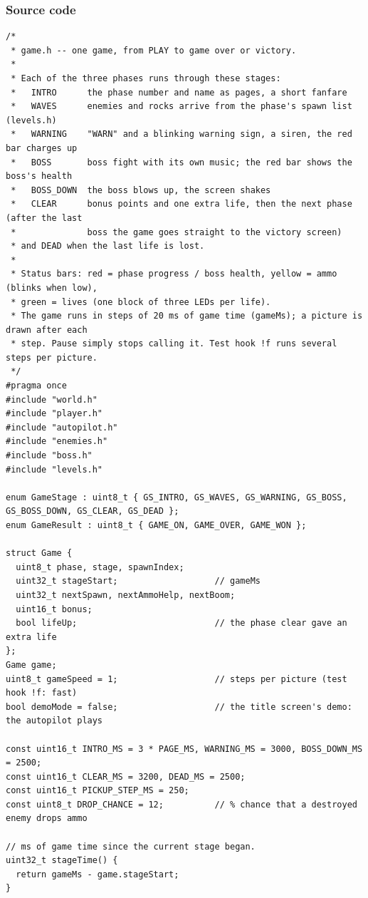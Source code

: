 \documentclass[11pt,a4paper]{article}
\begin{document}
\subsubsection*{Source code}
\begin{lstlisting}[language=Arduino]
/*
 * game.h -- one game, from PLAY to game over or victory.
 *
 * Each of the three phases runs through these stages:
 *   INTRO      the phase number and name as pages, a short fanfare
 *   WAVES      enemies and rocks arrive from the phase's spawn list (levels.h)
 *   WARNING    "WARN" and a blinking warning sign, a siren, the red bar charges up
 *   BOSS       boss fight with its own music; the red bar shows the boss's health
 *   BOSS_DOWN  the boss blows up, the screen shakes
 *   CLEAR      bonus points and one extra life, then the next phase (after the last
 *              boss the game goes straight to the victory screen)
 * and DEAD when the last life is lost.
 *
 * Status bars: red = phase progress / boss health, yellow = ammo (blinks when low),
 * green = lives (one block of three LEDs per life).
 * The game runs in steps of 20 ms of game time (gameMs); a picture is drawn after each
 * step. Pause simply stops calling it. Test hook !f runs several steps per picture.
 */
#pragma once
#include "world.h"
#include "player.h"
#include "autopilot.h"
#include "enemies.h"
#include "boss.h"
#include "levels.h"

enum GameStage : uint8_t { GS_INTRO, GS_WAVES, GS_WARNING, GS_BOSS, GS_BOSS_DOWN, GS_CLEAR, GS_DEAD };
enum GameResult : uint8_t { GAME_ON, GAME_OVER, GAME_WON };

struct Game {
  uint8_t phase, stage, spawnIndex;
  uint32_t stageStart;                   // gameMs
  uint32_t nextSpawn, nextAmmoHelp, nextBoom;
  uint16_t bonus;
  bool lifeUp;                           // the phase clear gave an extra life
};
Game game;
uint8_t gameSpeed = 1;                   // steps per picture (test hook !f: fast)
bool demoMode = false;                   // the title screen's demo: the autopilot plays

const uint16_t INTRO_MS = 3 * PAGE_MS, WARNING_MS = 3000, BOSS_DOWN_MS = 2500;
const uint16_t CLEAR_MS = 3200, DEAD_MS = 2500;
const uint16_t PICKUP_STEP_MS = 250;
const uint8_t DROP_CHANCE = 12;          // % chance that a destroyed enemy drops ammo

// ms of game time since the current stage began.
uint32_t stageTime() {
  return gameMs - game.stageStart;
}


\end{lstlisting}
\end{document}

